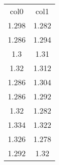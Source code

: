 \begin{table}
\begin{tabular}{cc}
col0 & col1 \\
1.298 & 1.282 \\
1.286 & 1.294 \\
1.3 & 1.31 \\
1.32 & 1.312 \\
1.286 & 1.304 \\
1.286 & 1.292 \\
1.32 & 1.282 \\
1.334 & 1.322 \\
1.326 & 1.278 \\
1.292 & 1.32 \\
\end{tabular}
\end{table}
